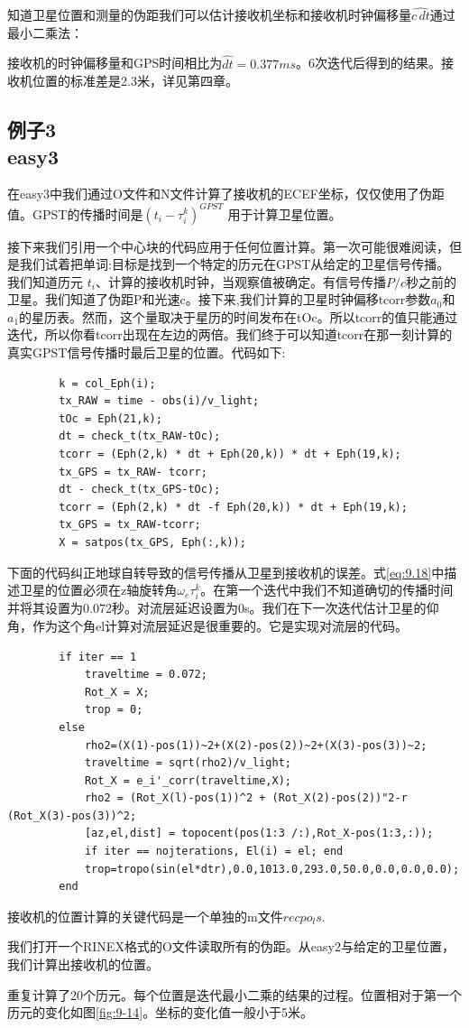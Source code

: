 	知道卫星位置和测量的伪距我们可以估计接收机坐标和接收机时钟偏移量$\widehat{c\,dt}$通过最小二乘法：
	
	接收机的时钟偏移量和GPS时间相比为$\widehat{dt} = 0.377 ms$。6次迭代后得到的结果。接收机位置的标准差是2.3米，详见第四章。

	\subsection[例子3]{例子3\\easy3}\label{subsec:easy3}
		在easy3中我们通过O文件和N文件计算了接收机的ECEF坐标，仅仅使用了伪距值。GPST的传播时间是$(t_i-\tau^k_i)^{GPST}$ 用于计算卫星位置。
		
		接下来我们引用一个中心块的代码应用于任何位置计算。第一次可能很难阅读，但是我们试着把单词:目标是找到一个特定的历元在GPST从给定的卫星信号传播。我们知道历元 $t_i$、计算的接收机时钟，当观察值被确定。有信号传播$P/c$秒之前的卫星。我们知道了伪距P和光速c。接下来,我们计算的卫星时钟偏移tcorr参数$a_0$和$a_1$的星历表。然而，这个量取决于星历的时间发布在tOc。所以tcorr的值只能通过迭代，所以你看tcorr出现在左边的两倍。我们终于可以知道tcorr在那一刻计算的真实GPST信号传播时最后卫星的位置。代码如下:
		\begin{lstlisting}
		k = col_Eph(i);
		tx_RAW = time - obs(i)/v_light;
		tOc = Eph(21,k);
		dt = check_t(tx_RAW-tOc);
		tcorr = (Eph(2,k) * dt + Eph(20,k)) * dt + Eph(19,k);
		tx_GPS = tx_RAW- tcorr;
		dt - check_t(tx_GPS-tOc);
		tcorr = (Eph(2,k) * dt -f Eph(20,k)) * dt + Eph(19,k);
		tx_GPS = tx_RAW-tcorr;
		X = satpos(tx_GPS, Eph(:,k));			
		\end{lstlisting}
		下面的代码纠正地球自转导致的信号传播从卫星到接收机的误差。式\ref{eq:9.18}中描述卫星的位置必须在z轴旋转角$\omega_e\tau^k_i$。在第一个迭代中我们不知道确切的传播时间并将其设置为0.072秒。对流层延迟设置为0s。我们在下一次迭代估计卫星的仰角，作为这个角el计算对流层延迟是很重要的。它是实现对流层的代码。
		\begin{lstlisting}
		if iter == 1
			traveltime = 0.072;
			Rot_X = X;
			trop = 0;
		else
			rho2=(X(1)-pos(1))~2+(X(2)-pos(2))~2+(X(3)-pos(3))~2;
			traveltime = sqrt(rho2)/v_light;
			Rot_X = e_i'_corr(traveltime,X);
			rho2 = (Rot_X(l)-pos(1))^2 + (Rot_X(2)-pos(2))"2-r (Rot_X(3)-pos(3))^2;
			[az,el,dist] = topocent(pos(1:3 /:),Rot_X-pos(1:3,:));
			if iter == nojterations, El(i) = el; end
			trop=tropo(sin(el*dtr),0.0,1013.0,293.0,50.0,0.0,0.0,0.0);
		end
		\end{lstlisting}
		接收机的位置计算的关键代码是一个单独的m文件$recpo_ls$.
		
		我们打开一个RINEX格式的O文件读取所有的伪距。从easy2与给定的卫星位置，我们计算出接收机的位置。
		
		重复计算了20个历元。每个位置是迭代最小二乘的结果的过程。位置相对于第一个历元的变化如图\ref{fig:9-14}。坐标的变化值一般小于5米。
		
		
	

